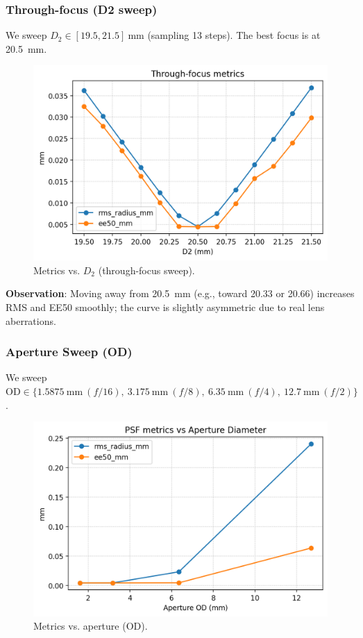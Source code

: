 \documentclass[11pt,a4paper]{article}
\begin{document}
	\subsubsection*{Through-focus (D2 sweep)}\label{through-focus-d2-sweep}
	
	We sweep \(D_2 \in [19.5, 21.5]\ \mathrm{mm}\) (sampling 13 steps). The best focus is at \SI{20.5}{mm}.
	
	\begin{figure}[H]
		\centering
		\includegraphics[width=\linewidth]{sweep_D2/metrics_vs_D2.png}
		\caption{Metrics vs. \(D_2\) (through-focus sweep).}
	\end{figure}
	
	\textbf{Observation}: Moving away from \SI{20.5}{mm} (e.g., toward 20.33 or 20.66) increases RMS and EE50 smoothly; the curve is slightly asymmetric due to real lens aberrations.
	
	\subsubsection*{Aperture Sweep (OD)}\label{aperture-sweep-od}
	
	We sweep \(\mathrm{OD} \in \{1.5875\ \mathrm{mm}\ (f/16),\ 3.175\ \mathrm{mm}\ (f/8),\ 6.35\ \mathrm{mm}\ (f/4),\ 12.7\ \mathrm{mm}\ (f/2)\}\).
	
	\begin{figure}[H]
		\centering
		\includegraphics[width=\linewidth]{sweep_OD/metrics_vs_OD.png}
		\caption{Metrics vs. aperture (OD).}
	\end{figure}
	
\end{document}
